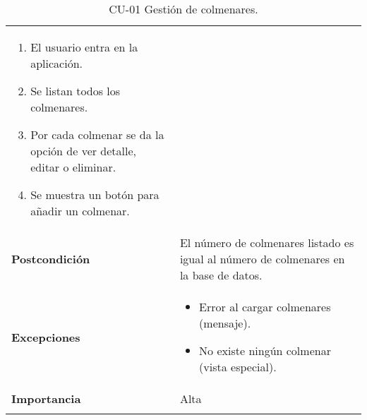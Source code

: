 \begin{longtable}[H]{@{}ll@{}}
\begin{minipage}[t]{0.71\columnwidth}
\begin{enumerate}
\def\labelenumi{\arabic{enumi}.}
\tightlist
\item
  El usuario entra en la aplicación.
\item
  Se listan todos los colmenares.
\item
  Por cada colmenar se da la opción de ver detalle, editar o eliminar.
\item
  Se muestra un botón para añadir un colmenar.
\end{enumerate}\strut
\end{minipage}\tabularnewline
\begin{minipage}[t]{0.23\columnwidth}\raggedright\strut
\textbf{Postcondición}\strut
\end{minipage} & \begin{minipage}[t]{0.71\columnwidth}\raggedright\strut
El número de colmenares listado es igual al número de colmenares en la
base de datos.\strut
\end{minipage}\tabularnewline
\begin{minipage}[t]{0.23\columnwidth}\raggedright\strut
\textbf{Excepciones}\strut
\end{minipage} & \begin{minipage}[t]{0.71\columnwidth}\raggedright\strut
\begin{itemize}
\tightlist
\item
  Error al cargar colmenares (mensaje).
\item
  No existe ningún colmenar (vista especial).
\end{itemize}\strut
\end{minipage}\tabularnewline
\begin{minipage}[t]{0.23\columnwidth}\raggedright\strut
\textbf{Importancia}\strut
\end{minipage} & \begin{minipage}[t]{0.71\columnwidth}\raggedright\strut
Alta\strut
\end{minipage}\tabularnewline
\bottomrule
\caption{CU-01 Gestión de colmenares.}
\end{longtable}

